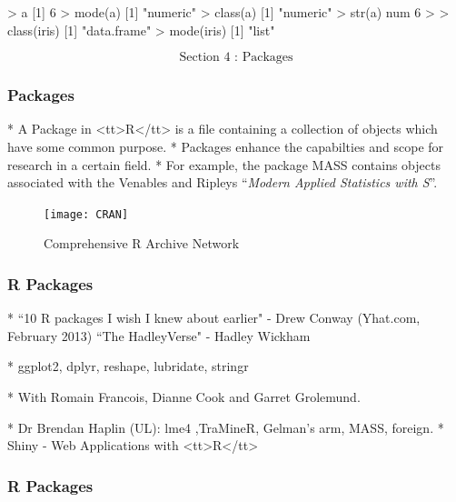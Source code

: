  
 
 \begin{semiverbatim}
 > a
 [1] 6
 > mode(a)
 [1] "numeric"
 > class(a)
 [1] "numeric"
 > str(a)
 num 6
 >
 > class(iris)
 [1] "data.frame"
 > mode(iris)
 [1] "list"
 \end{semiverbatim}
 
 
 
 
 \Huge
 \[\mbox{ Section 4 : Packages } \]
 
 
 \frametitle{Packages}
 
 
*  A Package in <tt>R</tt> is a file containing a collection of objects which have some common purpose.
*  Packages enhance the capabilties and scope for research in a certain field. 
*  For example, the
 package MASS contains objects associated with the Venables and Ripleys ``\textit{Modern Applied
 Statistics with S}”. 

 
 
 
 
 
 \begin{figure}
 \centering
 \texttt{[image: CRAN]}
 \caption{Comprehensive R Archive Network}
 
 \end{figure}
 
 
 
 
 
 
 \frametitle{R Packages}
 
 
*  ``10 R packages I wish I knew about earlier" - Drew Conway (Yhat.com, February 2013)
 \bigskip*  ``The HadleyVerse" - Hadley Wickham
 
 
*   ggplot2, dplyr, reshape, lubridate, stringr
 
*   With Romain Francois, Dianne Cook and Garret Grolemund.

 \bigskip
*  Dr Brendan Haplin (UL): lme4 ,TraMineR, Gelman's arm, MASS, foreign. 
 \bigskip
*  Shiny - Web Applications with <tt>R</tt>

 
 
 \frametitle{R Packages}
 
 
 
